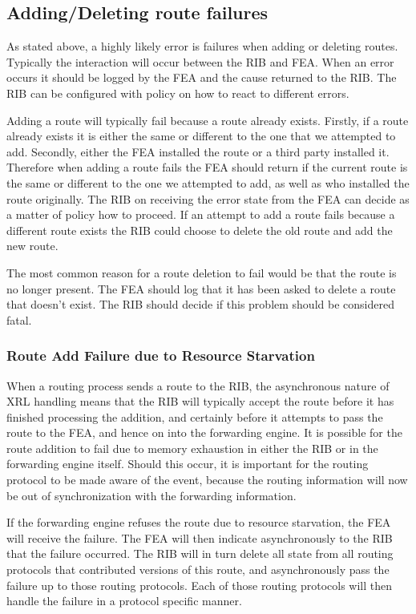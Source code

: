 \documentclass[11pt]{article}
\begin{document}
\subsection{Adding/Deleting route failures}

As stated above, a highly likely error is failures when adding or
deleting routes. Typically the interaction will occur between the RIB
and FEA. When an error occurs it should be logged by the FEA and the
cause returned to the RIB. The RIB can be configured with policy on
how to react to different errors.

Adding a route will typically fail because a route already exists.
Firstly, if a route already exists it is either the same or different
to the one that we attempted to add. Secondly, either the FEA
installed the route or a third party installed it. Therefore when
adding a route fails the FEA should return if the current route is the
same or different to the one we attempted to add, as well as who
installed the route originally. The RIB on receiving the error state
from the FEA can decide as a matter of policy how to proceed. If an
attempt to add a route fails because a different route exists the RIB
could choose to delete the old route and add the new route.

The most common reason for a route deletion to fail would be that the
route is no longer present. The FEA should log that it has been asked
to delete a route that doesn't exist. The RIB should decide if this
problem should be considered fatal.

\subsubsection{Route Add Failure due to Resource Starvation}

When a routing process sends a route to the RIB, the asynchronous
nature of XRL handling means that the RIB will typically accept the
route before it has finished processing the addition, and certainly
before it attempts to pass the route to the FEA, and hence on into the
forwarding engine.  It is possible for the route addition to fail due
to memory exhaustion in either the RIB or in the forwarding engine
itself.  Should this occur, it is important for the routing protocol
to be made aware of the event, because the routing information will
now be out of synchronization with the forwarding information.

If the forwarding engine refuses the route due to resource starvation,
the FEA will receive the failure.  The FEA will then indicate
asynchronously to the RIB that the failure occurred.  The RIB will in
turn delete all state from all routing protocols that contributed
versions of this route, and asynchronously pass the failure up to
those routing protocols.  Each of those routing protocols will then
handle the failure in a protocol specific manner.
\end{document}
